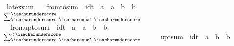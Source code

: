 \begin{isabellebody}
\isanewline
{}\isamarkupfalse%
\ {\isacharparenleft}{\kern0pt}latex{\isacharunderscore}{\kern0pt}sum\ \isanewline
\ \ {\isachardoublequoteopen}{\isacharunderscore}{\kern0pt}from{\isacharunderscore}{\kern0pt}to{\isacharunderscore}{\kern0pt}sum{\isachardoublequoteclose}\ {\isacharcolon}{\kern0pt}{\isacharcolon}{\kern0pt}\ {\isachardoublequoteopen}idt\ {\isasymRightarrow}\ {\isacharprime}{\kern0pt}a\ {\isasymRightarrow}\ {\isacharprime}{\kern0pt}a\ {\isasymRightarrow}\ {\isacharprime}{\kern0pt}b\ {\isasymRightarrow}\ {\isacharprime}{\kern0pt}b{\isachardoublequoteclose}\isanewline
\ {\isacharparenleft}{\kern0pt}{\isachardoublequoteopen}{\isacharparenleft}{\kern0pt}{}$\sum_{{\isacharunderscore}{\kern0pt}\ {\isacharequal}{\kern0pt}\ {\isacharunderscore}{\kern0pt}}^{{\isacharunderscore}{\kern0pt}}$\ {\isacharunderscore}{\kern0pt}{\isacharparenright}{\kern0pt}{\isachardoublequoteclose}\ {\isacharbrackleft}{\kern0pt}{}{\isacharcomma}{\kern0pt}{}{\isacharcomma}{\kern0pt}{}{\isacharcomma}{\kern0pt}{}{}{\isacharbrackright}{\kern0pt}\ {}{}{\isacharparenright}{\kern0pt}\isanewline
\ \ {\isachardoublequoteopen}{\isacharunderscore}{\kern0pt}from{\isacharunderscore}{\kern0pt}upto{\isacharunderscore}{\kern0pt}sum{\isachardoublequoteclose}\ {\isacharcolon}{\kern0pt}{\isacharcolon}{\kern0pt}\ {\isachardoublequoteopen}idt\ {\isasymRightarrow}\ {\isacharprime}{\kern0pt}a\ {\isasymRightarrow}\ {\isacharprime}{\kern0pt}a\ {\isasymRightarrow}\ {\isacharprime}{\kern0pt}b\ {\isasymRightarrow}\ {\isacharprime}{\kern0pt}b{\isachardoublequoteclose}\isanewline
\ {\isacharparenleft}{\kern0pt}{\isachardoublequoteopen}{\isacharparenleft}{\kern0pt}{}$\sum_{{\isacharunderscore}{\kern0pt}\ {\isacharequal}{\kern0pt}\ {\isacharunderscore}{\kern0pt}}^{<{\isacharunderscore}{\kern0pt}}$\ {\isacharunderscore}{\kern0pt}{\isacharparenright}{\kern0pt}{\isachardoublequoteclose}\ {\isacharbrackleft}{\kern0pt}{}{\isacharcomma}{\kern0pt}{}{\isacharcomma}{\kern0pt}{}{\isacharcomma}{\kern0pt}{}{}{\isacharbrackright}{\kern0pt}\ {}{}{\isacharparenright}{\kern0pt}\isanewline
\ \ {\isachardoublequoteopen}{\isacharunderscore}{\kern0pt}upt{\isacharunderscore}{\kern0pt}sum{\isachardoublequoteclose}\ {\isacharcolon}{\kern0pt}{\isacharcolon}{\kern0pt}\ {\isachardoublequoteopen}idt\ {\isasymRightarrow}\ {\isacharprime}{\kern0pt}a\ {\isasymRightarrow}\ {\isacharprime}{\kern0pt}b\ {\isasymRightarrow}\ {\isacharprime}{\kern0pt}b{\isachardoublequoteclose}\isanewline

\end{isabellebody}
